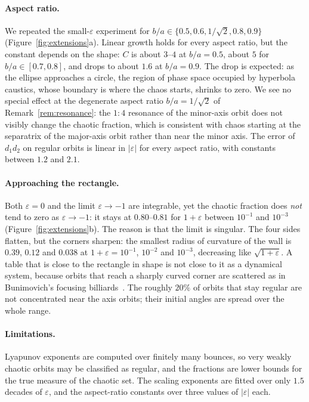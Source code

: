 \documentclass[11pt]{amsart}
\theoremstyle{remark}
\begin{document}
\paragraph{Aspect ratio.} We repeated the small-$\varepsilon$ experiment for
$b/a \in \{0.5, 0.6, 1/\sqrt2, 0.8, 0.9\}$ (Figure~\ref{fig:extensions}a).
Linear growth holds for every aspect ratio, but the constant depends on the
shape: $C$ is about $3$--$4$ at $b/a = 0.5$, about $5$ for
$b/a \in [0.7, 0.8]$, and drops to about $1.6$ at $b/a = 0.9$. The drop is
expected: as the ellipse approaches a circle, the region of phase space
occupied by hyperbola caustics, whose boundary is where the chaos starts,
shrinks to zero. We see no special effect at the degenerate aspect ratio
$b/a = 1/\sqrt2$ of Remark~\ref{rem:resonance}: the $1{:}4$ resonance of the
minor-axis orbit does not visibly change the chaotic fraction, which is
consistent with chaos starting at the separatrix of the major-axis orbit
rather than near the minor axis. The error of $d_1d_2$ on regular orbits is
linear in $|\varepsilon|$ for every aspect ratio, with constants between $1.2$
and $2.1$.

\paragraph{Approaching the rectangle.} Both $\varepsilon = 0$ and the limit
$\varepsilon \to -1$ are integrable, yet the chaotic fraction does
\emph{not} tend to zero as $\varepsilon \to -1$: it stays at $0.80$--$0.81$
for $1 + \varepsilon$ between $10^{-1}$ and $10^{-3}$
(Figure~\ref{fig:extensions}b). The reason is that the limit is singular. The
four sides flatten, but the corners sharpen: the smallest radius of curvature
of the wall is $0.39$, $0.12$ and $0.038$ at $1 + \varepsilon = 10^{-1}$,
$10^{-2}$ and $10^{-3}$, decreasing like $\sqrt{1 + \varepsilon}$. A table that
is close to the rectangle in shape is not close to it as a dynamical system,
because orbits that reach a sharply curved corner are scattered as in
Bunimovich's focusing billiards~\cite{Bunimovich1979}. The roughly $20\%$ of
orbits that stay regular are not concentrated near the axis orbits; their
initial angles are spread over the whole range.

\paragraph{Limitations.} Lyapunov exponents are computed over finitely many
bounces, so very weakly chaotic orbits may be classified as regular, and the
fractions are lower bounds for the true measure of the chaotic set. The
scaling exponents are fitted over only $1.5$ decades of $\varepsilon$, and the
aspect-ratio constants over three values of $|\varepsilon|$ each.
\end{document}
